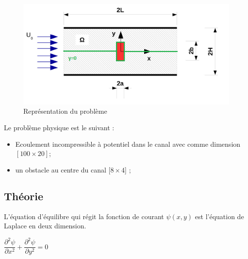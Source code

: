 \documentclass[a4paper,11pt]{report} %
\begin{document}
\begin{figure}[!h]
\centering
\hspace*{0mm}\vfill
\begin{center} \includegraphics{vitessenulleparoi.png} \end{center}
\vfill\hspace*{0mm}
\caption{Représentation du problème}
\label{Tux}
\end{figure}

\pagebreak

Le problème physique est le suivant :
\begin{itemize} 
   \item Ecoulement incompressible à potentiel dans le canal avec comme dimension $[100\times20]$;
   \item un obstacle au centre du canal [$8\times4$] ;
\end{itemize}

\subsection{Théorie}

L'équation d'équilibre qui régit la fonction de courant $\psi(x,y)$ est l'équation de Laplace en deux dimension.
\begin{center}
$\dfrac{\partial^2\psi}{\partial x^2}+\dfrac{\partial^2\psi}{\partial y^2}=0$
\end{center}
\end{document}
